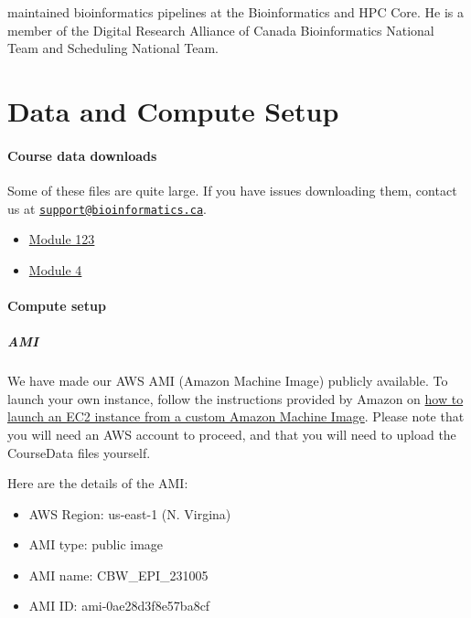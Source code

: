 \documentclass[
]{book}
\providecommand{\tightlist}{%
  \setlength{\itemsep}{0pt}\setlength{\parskip}{0pt}}
\begin{document}
maintained bioinformatics pipelines at the Bioinformatics and HPC Core. He is a member of the
Digital Research Alliance of Canada Bioinformatics National Team and Scheduling National
Team.

\chapter{Data and Compute Setup}\label{data-and-compute-setup}

\subsubsection{Course data downloads}\label{course-data-downloads}

Some of these files are quite large. If you have issues downloading them, contact us at \href{mailto:support@bioinformatics.ca}{\nolinkurl{support@bioinformatics.ca}}.

\begin{itemize}
\tightlist
\item
  \href{}{Module 123}
\item
  \href{}{Module 4}
\end{itemize}

\subsubsection{Compute setup}\label{compute-setup}

\paragraph{AMI}\label{ami}

We have made our AWS AMI (Amazon Machine Image) publicly available. To launch your own instance, follow the instructions provided by Amazon on \href{https://repost.aws/knowledge-center/launch-instance-custom-ami}{how to launch an EC2 instance from a custom Amazon Machine Image}. Please note that you will need an AWS account to proceed, and that you will need to upload the CourseData files yourself.

Here are the details of the AMI:

\begin{itemize}
\tightlist
\item
  AWS Region: us-east-1 (N. Virgina)
\item
  AMI type: public image
\item
  AMI name: CBW\_EPI\_231005
\item
  AMI ID: ami-0ae28d3f8e57ba8cf
\end{itemize}
\end{document}
